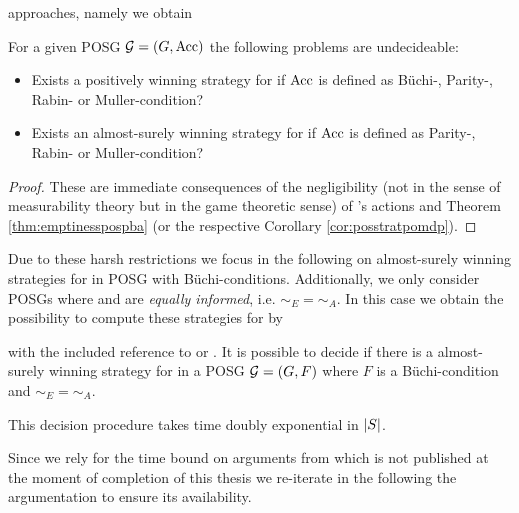 approaches, namely we obtain
\begin{corollary}
  \cite{PureStratPOSG, POSG}
  For a given \ac{POSG} $\mathcal{G} = \left(G, \operatorname{Acc}\right)$ the following problems
  are undecideable:
  \begin{itemize}
    \item Exists a positively winning strategy for \eve{} if $\operatorname{Acc}$ is defined 
      as Büchi-, Parity-, Rabin- or Muller-condition?
    \item Exists an almost-surely winning strategy for \eve{} if $\operatorname{Acc}$ is
      defined as Parity-, Rabin- or Muller-condition?
  \end{itemize}
\end{corollary}
\begin{proof}
  These are immediate consequences of the negligibility (not in the sense of
  measurability theory but in the game theoretic sense) of \adam{}'s actions
  and Theorem \ref{thm:emptinesspospba} (or the respective Corollary 
  \ref{cor:posstratpomdp}).
\end{proof}
Due to these harsh restrictions we focus in the following on almost-surely 
winning strategies for \eve{} in \ac{POSG} with Büchi-conditions. Additionally,
we only consider \acp{POSG} where \eve{} and \adam{} are 
\emph{equally informed}, i.e. $\sim_{E} = \sim_{A}$. In this case
we obtain the possibility to compute these strategies for \eve{} by
\begin{theorem}
  \cite[Theorem 6]{POSG} with the included reference to 
  \cite[Lemma 4]{DecProblemsForProbAuto} or \cite[Theorem 5.3]{PureStratPOSG}.
  It is possible to decide if there is a almost-surely winning strategy for 
  \eve{} in a \ac{POSG} $\mathcal{G} = \left(G, F\right)$ where $F$ is a 
  Büchi-condition and $\sim_{E} = \sim_{A}$.

  This decision procedure takes time doubly exponential in $\left\vert{S}\right\vert$.
\end{theorem}
Since we rely for the time bound on arguments from \cite{PureStratPOSG} which 
is not published at the moment of completion of this thesis we re-iterate
in the following the argumentation to ensure its availability.
